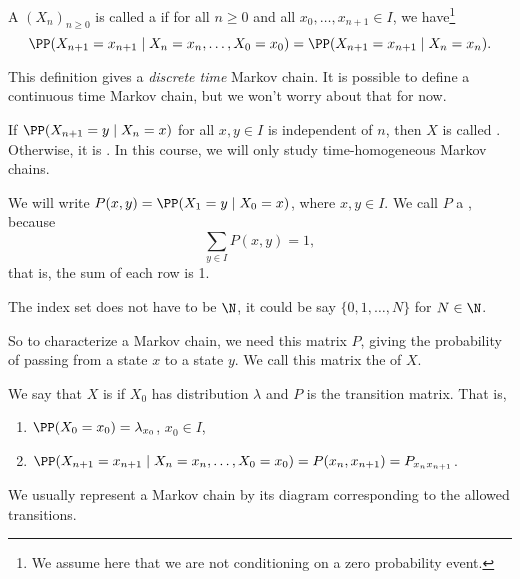 \documentclass[a4paper]{scrartcl}
\begin{document}
\begin{definition}
	A  $(X_n)_{n \geq 0}$ is called a  if for all $n \geq 0$ and all $x_0, \dots, x_{n+1} \in I$, we have\footnote{We assume here that we are not conditioning on a zero probability event.}
	$$
	\PP(X_{n + 1} = x_{n + 1} \mid X_n = x_n, \dots, X_0 = x_0) = \PP(X_{n + 1} = x_{n + 1} \mid X_n = x_n).
	$$
\end{definition}

\begin{remark}
	This definition gives a \emph{discrete time} Markov chain. It is possible to define a continuous time Markov chain, but we won't worry about that for now.
\end{remark}

If $\PP(X_{n + 1} = y \mid X_n = x)$ for all $x, y \in I$ is independent of $n$, then $X$ is called . Otherwise, it is . In this course, we will only study time-homogeneous Markov chains.

We will write $P(x, y) = \PP(X_1 = y \mid X_0 = x)$, where $x, y \in I$. We call $P$ a , because
$$
	\sum_{y \in I} P(x, y) = 1,
$$
that is, the sum of each row is 1.


\begin{remark}
	The index set does not have to be $\N$, it could be say $\{0, 1, \dots, N\}$ for $N \in \N$.
\end{remark}

So to characterize a Markov chain, we need this matrix $P$, giving the probability of passing from a state $x$ to a state $y$. We call this matrix the  of $X$.

\begin{definition}[Markov]
	We say that $X$ is  if $X_0$ has distribution $\lambda$ and $P$ is the transition matrix. That is,
	\begin{enumerate}[label=(\roman*)]
		\item $\PP(X_0 = x_0) = \lambda_{x_0}$, $x_0 \in I$,
		\item $\PP(X_{n + 1} = x_{n + 1} \mid X_n = x_n, \dots, X_0 = x_0) = P(x_n, x_{n + 1}) = P_{x_n x_{n + 1}}$.
	\end{enumerate}
\end{definition}

We usually represent a Markov chain by its diagram corresponding to the allowed transitions. 
\end{document}
